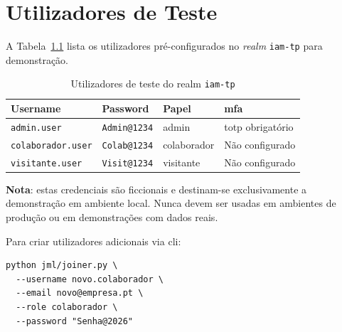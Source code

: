 \chapter{Utilizadores de Teste}
\label{anx:utilizadores}

A Tabela~\ref{tab:users} lista os utilizadores pré-configurados no \textit{realm} \texttt{iam-tp} para demonstração.

\begin{table}[h!]
\centering
\caption{Utilizadores de teste do realm \texttt{iam-tp}}
\label{tab:users}
\begin{tabular}{|l|l|l|l|}
\hline
\textbf{Username} & \textbf{Password} & \textbf{Papel} & \textbf{\gls{mfa}} \\ \hline
\texttt{admin.user} & \texttt{Admin@1234} & admin & \gls{totp} obrigatório \\ \hline
\texttt{colaborador.user} & \texttt{Colab@1234} & colaborador & Não configurado \\ \hline
\texttt{visitante.user} & \texttt{Visit@1234} & visitante & Não configurado \\ \hline
\end{tabular}
\end{table}

\textbf{Nota}: estas credenciais são ficcionais e destinam-se exclusivamente a demonstração em ambiente local. Nunca devem ser usadas em ambientes de produção ou em demonstrações com dados reais.

Para criar utilizadores adicionais via \gls{cli}:

\begin{lstlisting}[caption={Criar utilizador via script Joiner},label={lst:joiner_cli}]
python jml/joiner.py \
  --username novo.colaborador \
  --email novo@empresa.pt \
  --role colaborador \
  --password "Senha@2026"
\end{lstlisting}
